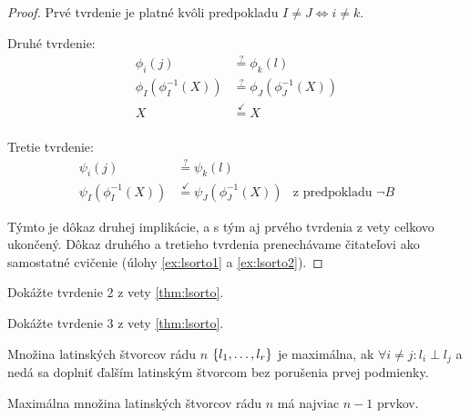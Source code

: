 \begin{toreview}
\begin{proof}
Prvé tvrdenie je platné kvôli predpokladu $I \neq J \Longleftrightarrow i \neq k$.

Druhé tvrdenie:
\begin{align*}
\phi_i(j) &\overset{?}{=} \phi_k(l)\\
\phi_I(\phi_I^{-1}(X)) &\overset{?}{=} \phi_J(\phi_J^{-1}(X))\\
X &\overset{\checkmark}{=} X\\
\end{align*}

Tretie tvrdenie:
\begin{align*}
\psi_i(j) &\overset{?}{=} \psi_k(l)\\
\psi_I(\phi_I^{-1}(X)) &\overset{\checkmark}{=} \psi_J(\phi_J^{-1}(X))&\text{z predpokladu $\neg B$}
\end{align*}

Týmto je dôkaz druhej implikácie, a s tým aj prvého tvrdenia z vety celkovo ukončený.
Dôkaz druhého a tretieho tvrdenia prenechávame čitateľovi ako samostatné cvičenie (úlohy \ref{ex:lsorto1} a \ref{ex:lsorto2}).
\end{proof}

\begin{exercise}
\label{ex:lsorto1}
Dokážte tvrdenie 2 z vety \ref{thm:lsorto}.
\end{exercise}

\begin{exercise}
\label{ex:lsorto2}
Dokážte tvrdenie 3 z vety \ref{thm:lsorto}.
\end{exercise}

\end{toreview}


\begin{definition}
Množina latinských štvorcov rádu $n$ $\left\{l_1, \ldots, l_r\right\}$ je maximálna, ak $\forall i \neq j: l_i \perp l_j$ a 
nedá sa doplniť ďalším latinským štvorcom bez porušenia prvej podmienky. 
\end{definition}

\begin{theorem}
Maximálna množina latinských štvorcov rádu $n$ má najviac $n-1$ prvkov.
\end{theorem}

